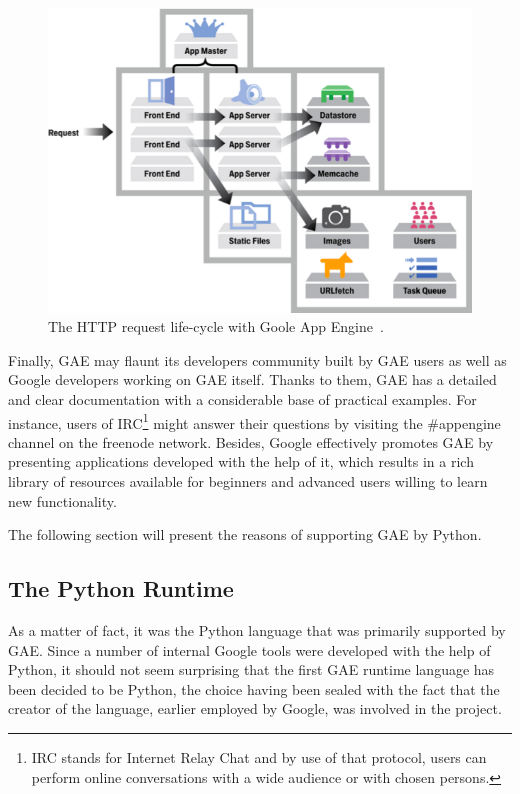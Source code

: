 \begin{figure}[ht]
\begin{center}
\includegraphics[scale=0.4]{img/gae_request.png}
\caption{The HTTP request life-cycle with Goole App Engine~\cite{gae_request_cycle}.}
\label{fig:gae_request_cycle}
\end{center}
\end{figure}

Finally, GAE may flaunt its developers community built by GAE users as well as Google developers working on GAE itself. Thanks to them, GAE has a detailed and clear documentation with a considerable base of practical examples. For instance, users of IRC\footnote{IRC stands for Internet Relay Chat and by use of that protocol, users can perform online conversations with a wide audience or with chosen persons.} might answer their questions by visiting the \#appengine channel on the freenode network. Besides, Google effectively promotes GAE by presenting applications developed with the help of it, which results in a rich library of resources available for beginners and advanced users willing to learn new functionality.

The following section will present the reasons of supporting GAE by Python. 
  
  
\subsection{The Python Runtime}\label{subsec:gae_py}
As a matter of fact, it was the Python language that was primarily supported by GAE. Since a number of internal Google tools were developed with the help of Python, it should not seem surprising that the first GAE runtime language has been decided to be Python, the choice having been sealed with the fact that the creator of the language, earlier employed by Google, was involved in the project.

